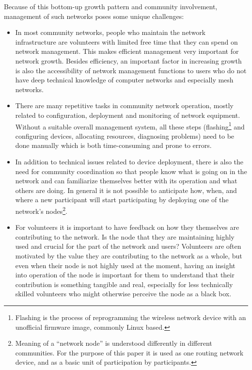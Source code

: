 \documentclass[5p,sort&compress]{elsarticle}
\begin{document}
Because of this bottom-up growth pattern and community involvement, management of such networks poses some unique challenges:

\begin{itemize}
\item In most community networks, people who maintain the network infrastructure are volunteers with limited free time that they can spend on network management.
This makes efficient management very important for network growth.
Besides efficiency, an important factor in increasing growth is also the accessibility of network management functions to users who do not have deep technical knowledge of computer networks and especially mesh networks.

\item There are many repetitive tasks in community network operation, mostly related to configuration, deployment and monitoring of network equipment.
Without a suitable overall management system, all these steps (flashing\footnote{Flashing is the process of reprogramming the wireless network device with an unofficial firmware image, commonly Linux based.} and configuring devices, allocating resources, diagnosing problems) need to be done manually which is both time-consuming and prone to errors.

\item In addition to technical issues related to device deployment, there is also the need for community coordination so that people know what is going on in the network and can familiarize themselves better with its operation and what others are doing.
In general it is not possible to anticipate how, when, and where a new participant will start participating by deploying one of the network's nodes\footnote{Meaning of a ``network node'' is understood differently in different communities. For the purpose of this paper it is used as one routing network device, and as a basic unit of participation by participants.}.

\item For volunteers it is important to have feedback on how they themselves are contributing to the network.
Is the node that they are maintaining highly used and crucial for the part of the network and users?
Volunteers are often motivated by the value they are contributing to the network as a whole, but even when their node is not highly used at the moment, having an insight into operation of the node is important for them to understand that their contribution is something tangible and real, especially for less technically skilled volunteers who might otherwise perceive the node as a black box.
\end{itemize}
\end{document}
